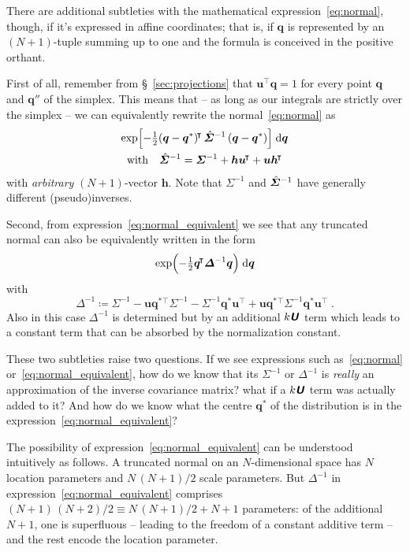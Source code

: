 \documentclass[\ifafour a4paper,12pt,\else a5paper,10pt,\fi%
onecolumn,oneside,article,%
british%
]{memoir}
\theoremstyle{remark}
\theoremstyle{innote}
\newcommand*{\mathte}[1]{\textbf{\textit{\textsf{#1}}}}
\newcommand*{\di}{\mathrm{d}}%
\newcommand*{\defd}{\coloneqq}
\renewcommand*{\|}[1][]{\nonscript\,#1\vert\nonscript\;\mathopen{}}
\newcommand*{\sect}{\S}%
\newcommand*{\T}{^{\mathord{\!\intercal}}}%
\newcommand*{\yq}{\bm{q}}
\newcommand*{\yu}{\bm{u}}
\newcommand*{\yuu}{\mathte{U}} %
\newcommand*{\yui}{\mathte{U}^{\mathord{\parallel}}}
\newcommand*{\yqr}{\yq^{*}}
\newcommand*{\ySigma}{\bm{\varSigma}}
\newcommand*{\ySigmab}{\Hat{\ySigma}\vphantom{\ySigma}}
\newcommand*{\yDelta}{\bm{\varDelta}}
\newcommand*{\yya}{\bm{h}}
\newcommand*{\yyb}{k}
\begin{document}
There are additional subtleties with the mathematical
expression~\eqref{eq:normal}, though, if it's expressed in affine
coordinates; that is, if $\yq$ is represented by an $(N+1)$-tuple summing up
to one and the formula is conceived in the positive orthant.

First of all, remember from \sect~\ref{sec:projections} that
$\yu\T\yq = 1$ for every point $\yq$ and $\yq''$ of the simplex.
This means that -- as long as our integrals are strictly over the simplex
-- we can equivalently rewrite the normal~\eqref{eq:normal} as
\begin{equation}
  \label{eq:normal_equivalent}
  \begin{gathered}
\exp\Bigl[-\tfrac{1}{2}
(\yq-\yqr)\T \, \ySigmab^{-1}\, (\yq-\yqr)
\Bigr] \;\di\yq
\\
\text{with}\quad
\ySigmab^{-1} =
\ySigma^{-1} + \yya\yu\T + \yu\yya\T %
\end{gathered}
\end{equation}
with \emph{arbitrary} $(N+1)$-vector $\yya$. Note that
$\ySigma^{-1}$ and $\ySigmab^{-1}$ have generally different (pseudo)inverses.

Second, from expression~\eqref{eq:normal_equivalent} we see that any
truncated normal can also be equivalently written in the form
\begin{equation}
  \label{eq:normal_simple}
  \exp\Bigl(-\tfrac{1}{2}
\yq\T \yDelta^{-1} \yq
  \Bigr) \;\di\yq
\end{equation}
with
\begin{equation}
  \label{eq:delta_simple_normal}
  \yDelta^{-1} \defd \ySigma^{-1} - \yu\yqr{}\T\ySigma^{-1} - \ySigma^{-1}\yqr\yu\T
  + \yu\yqr{}\T\ySigma^{-1}\yqr\yu\T \;.
\end{equation}
Also in this case $\yDelta^{-1}$ is determined but by an additional
$\yyb\yuu$ term which leads to a constant term that can be absorbed by the
normalization constant.

These two subtleties raise two questions. If we see expressions such
as~\eqref{eq:normal} or~\eqref{eq:normal_equivalent}, how do we know that
its $\ySigma^{-1}$ or $\yDelta^{-1}$ is \emph{really} an approximation of
the inverse covariance matrix? what if a $k\yuu$ term was actually added to
it? And how do we know what the centre $\yqr$ of the distribution is in the
expression~\eqref{eq:normal_equivalent}?

The possibility of expression~\eqref{eq:normal_equivalent} can be
understood intuitively as follows. A truncated normal on an $N$-dimensional
space has $N$ location parameters and $N\,(N+1)/2$ scale parameters. But
$\yDelta^{-1}$ in expression~\eqref{eq:normal_equivalent} comprises
$(N+1)\,(N+2)/2 \equiv N\,(N+1)/2 + N + 1$ parameters: of the additional
$N+1$, one is superfluous -- leading to the freedom of a constant additive
term -- and the rest encode the location parameter.
\end{document}
